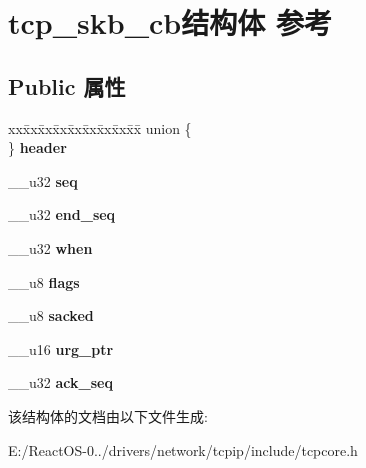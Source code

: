 \hypertarget{structtcp__skb__cb}{}\section{tcp\+\_\+skb\+\_\+cb结构体 参考}
\label{structtcp__skb__cb}
\subsection*{Public 属性}
\begin{DoxyCompactItemize}
\item 
\mbox{\label{structtcp__skb__cb_acb35054730d0b7d5dc4064512cc7d500}} 
\begin{tabbing}
xx\=xx\=xx\=xx\=xx\=xx\=xx\=xx\=xx\=\kill
union \{\\
\} {\bfseries header}\\

\end{tabbing}\item 
\mbox{\label{structtcp__skb__cb_a15d90a1c55242031b8f95804923bd86f}} 
\+\_\+\+\_\+u32 {\bfseries seq}
\item 
\mbox{\label{structtcp__skb__cb_ab603bdd5235e72ad44002bfbfec88d8d}} 
\+\_\+\+\_\+u32 {\bfseries end\+\_\+seq}
\item 
\mbox{\label{structtcp__skb__cb_a0b4ddf0b7e7455f30164b692e67c1b0c}} 
\+\_\+\+\_\+u32 {\bfseries when}
\item 
\mbox{\label{structtcp__skb__cb_a6419d8db8c9f056755d859c60be0ff97}} 
\+\_\+\+\_\+u8 {\bfseries flags}
\item 
\mbox{\label{structtcp__skb__cb_a39bbb065994e6f44d8905179035544f2}} 
\+\_\+\+\_\+u8 {\bfseries sacked}
\item 
\mbox{\label{structtcp__skb__cb_a4e29c1b5da2dc06b20987ea0bff80ae4}} 
\+\_\+\+\_\+u16 {\bfseries urg\+\_\+ptr}
\item 
\mbox{\label{structtcp__skb__cb_aba8abc28c62c34392dd2c13a6c5d885f}} 
\+\_\+\+\_\+u32 {\bfseries ack\+\_\+seq}
\end{DoxyCompactItemize}


该结构体的文档由以下文件生成\+:\begin{DoxyCompactItemize}
\item 
E\+:/\+React\+O\+S-\/0../drivers/network/tcpip/include/tcpcore.\+h\end{DoxyCompactItemize}
